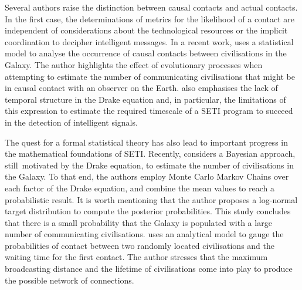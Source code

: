 \documentclass[crop]{CSLB}
\begin{document}
Several authors raise the distinction between causal contacts and
actual contacts.
%
In the first case, the determinations of metrics for the likelihood of
a contact are independent of considerations about the technological
resources or the implicit coordination to decipher intelligent
messages.
%
In a recent work, \citet{balbi_impact_2018} uses a statistical model to
analyse the occurrence of causal contacts between civilisations in the
Galaxy.
%
The author highlights the effect of evolutionary processes when
attempting to estimate the number of communicating civilisations that
might be in causal contact with an observer on the Earth.
%
\citet{cirkovic_temporal_2004} also emphasises the lack of temporal
structure in the Drake equation and, in particular, the limitations
of this expression to estimate the required timescale of a SETI
program to succeed in the detection of intelligent signals.



The quest for a formal statistical theory has also lead 
to important progress in the mathematical foundations of SETI.
%
Recently, \citet{bloetscher_using_2019} considers a Bayesian approach,
still motivated by the Drake equation, to estimate
the number of civilisations in the Galaxy.
%
To that end, the authors employ Monte Carlo Markov Chains over each factor
of the Drake equation, and combine the mean values to reach a probabilistic
result.
%
It is worth mentioning that the author proposes a log-normal target
distribution to compute the posterior probabilities.
%
This study concludes that there is a small probability that the Galaxy
is populated with a large number of communicating civilisations.
%
\citet{smith_broadcasting_2009} uses an analytical model to gauge the
probabilities of contact between two randomly located civilisations
and the waiting time for the first contact.
%
The author stresses that 
the maximum broadcasting distance and the lifetime of civilisations
come into play to produce the possible network of connections.
\end{document}
